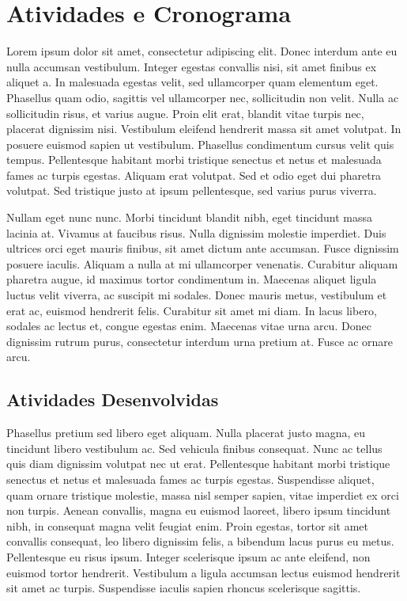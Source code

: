 \chapter[Atividades e Cronograma]{Atividades e Cronograma}


Lorem ipsum dolor sit amet, consectetur adipiscing elit. Donec interdum ante eu nulla accumsan vestibulum. Integer egestas convallis nisi, sit amet finibus ex aliquet a. In malesuada egestas velit, sed ullamcorper quam elementum eget. Phasellus quam odio, sagittis vel ullamcorper nec, sollicitudin non velit. Nulla ac sollicitudin risus, et varius augue. Proin elit erat, blandit vitae turpis nec, placerat dignissim nisi. Vestibulum eleifend hendrerit massa sit amet volutpat. In posuere euismod sapien ut vestibulum. Phasellus condimentum cursus velit quis tempus. Pellentesque habitant morbi tristique senectus et netus et malesuada fames ac turpis egestas. Aliquam erat volutpat. Sed et odio eget dui pharetra volutpat. Sed tristique justo at ipsum pellentesque, sed varius purus viverra.

Nullam eget nunc nunc. Morbi tincidunt blandit nibh, eget tincidunt massa lacinia at. Vivamus at faucibus risus. Nulla dignissim molestie imperdiet. Duis ultrices orci eget mauris finibus, sit amet dictum ante accumsan. Fusce dignissim posuere iaculis. Aliquam a nulla at mi ullamcorper venenatis. Curabitur aliquam pharetra augue, id maximus tortor condimentum in. Maecenas aliquet ligula luctus velit viverra, ac suscipit mi sodales. Donec mauris metus, vestibulum et erat ac, euismod hendrerit felis. Curabitur sit amet mi diam. In lacus libero, sodales ac lectus et, congue egestas enim. Maecenas vitae urna arcu. Donec dignissim rutrum purus, consectetur interdum urna pretium at. Fusce ac ornare arcu.

\section{Atividades Desenvolvidas}

Phasellus pretium sed libero eget aliquam. Nulla placerat justo magna, eu tincidunt libero vestibulum ac. Sed vehicula finibus consequat. Nunc ac tellus quis diam dignissim volutpat nec ut erat. Pellentesque habitant morbi tristique senectus et netus et malesuada fames ac turpis egestas. Suspendisse aliquet, quam ornare tristique molestie, massa nisl semper sapien, vitae imperdiet ex orci non turpis. Aenean convallis, magna eu euismod laoreet, libero ipsum tincidunt nibh, in consequat magna velit feugiat enim. Proin egestas, tortor sit amet convallis consequat, leo libero dignissim felis, a bibendum lacus purus eu metus. Pellentesque eu risus ipsum. Integer scelerisque ipsum ac ante eleifend, non euismod tortor hendrerit. Vestibulum a ligula accumsan lectus euismod hendrerit sit amet ac turpis. Suspendisse iaculis sapien rhoncus scelerisque sagittis.

